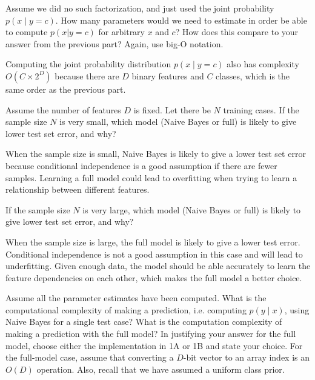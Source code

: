 \problem[8] Assume we did no such factorization, and just used the joint probability $p(x \mid y = c)$. How many parameters would we need to estimate in order be able to compute $p(x | y = c)$ for arbitrary $x$ and $c$? How does this compare to your answer from the previous part? Again, use big-O notation.

\begin{solution}
  Computing the joint probability distribution  $p(x \mid y = c)$ also has complexity $O(C \times 2^D)$ because there are $D$ binary features and $C$ classes, which is the same order as the previous part.
\end{solution}

\problem[4] Assume the number of features $D$ is fixed. Let there be $N$ training cases. If the sample size $N$ is very small, which model (Naive Bayes or full) is likely to give lower test set error, and why?

\begin{solution}
  When the sample size is small, Naive Bayes is likely to give a lower test set error because conditional independence is a good assumption if there are fewer samples. Learning a full model could lead to overfitting when trying to learn a relationship between different features.
\end{solution}

\problem[4] If the sample size $N$ is very large, which model (Naive Bayes or full) is likely to give lower test set error, and why?
\begin{solution} 
  When the sample size is large, the full model is likely to give a lower test error. Conditional independence is not a good assumption in this case and will lead to underfitting. Given enough data, the model should be able accurately to learn the feature dependencies on each other, which makes the full model a better choice.
\end{solution}

\problem[8 EC] Assume all the parameter estimates have been computed. What is the computational complexity of making a prediction, i.e. computing $p(y \mid x)$, using Naive Bayes for a single test case? What is the computation complexity of making a prediction with the full model? In justifying your answer for the full model, choose either the implementation in 1A or 1B and state your choice. For the full-model case, assume that converting a $D$-bit vector to an array index is an $O(D)$ operation.  Also, recall that we have assumed a uniform class prior. 

